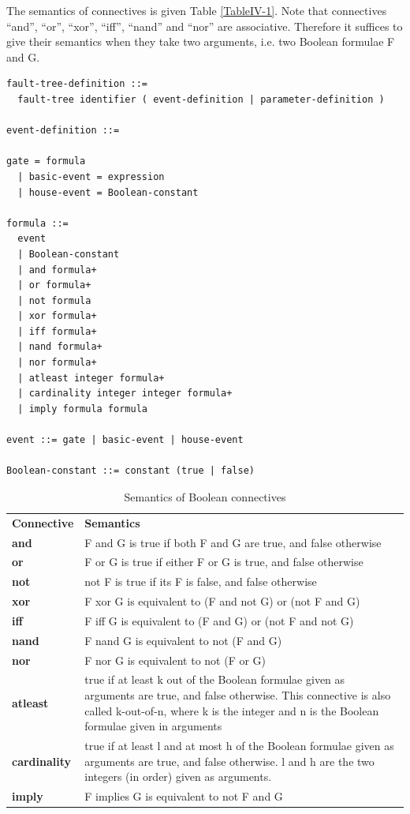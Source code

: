 \documentclass[11pt]{article}
\begin{document}
The semantics of connectives is given Table \ref{TableIV-1}. Note that connectives
``and'', ``or'', ``xor'', ``iff'', ``nand'' and ``nor'' are associative. Therefore
it suffices to give their semantics when they take two arguments, i.e.
two Boolean formulae F and G.


\lstset{language=XML,label= ,caption= ,captionpos=b,numbers=none}
\begin{lstlisting}
fault-tree-definition ::=
  fault-tree identifier ( event-definition | parameter-definition )

event-definition ::=

gate = formula
  | basic-event = expression
  | house-event = Boolean-constant

formula ::=
  event
  | Boolean-constant
  | and formula+
  | or formula+
  | not formula
  | xor formula+
  | iff formula+
  | nand formula+
  | nor formula+
  | atleast integer formula+
  | cardinality integer integer formula+
  | imply formula formula

event ::= gate | basic-event | house-event

Boolean-constant ::= constant (true | false)
\end{lstlisting}

\begin{table}[htbp]
\caption{\label{tab:org6263390}
Semantics of Boolean connectives}
\centering
\begin{tabular}{ll}
\textbf{Connective} & \textbf{Semantics}\\
\textbf{and} & F and G is true if both F and G are true, and false otherwise\\
\textbf{or} & F or G is true if either F or G is true, and false otherwise\\
\textbf{not} & not F is true if its F is false, and false otherwise\\
\textbf{xor} & F xor G is equivalent to (F and not G) or (not F and G)\\
\textbf{iff} & F iff G is equivalent to (F and G) or (not F and not G)\\
\textbf{nand} & F nand G is equivalent to not (F and G)\\
\textbf{nor} & F nor G is equivalent to not (F or G)\\
\textbf{atleast} & true if at least k out of the Boolean formulae given as arguments are true, and false otherwise. This connective is also called k-out-of-n, where k is the integer and n is the Boolean formulae given in arguments\\
\textbf{cardinality} & true if at least l and at most h of the Boolean formulae given as arguments are true, and false otherwise. l and h are the two integers (in order) given as arguments.\\
\textbf{imply} & F implies G is equivalent to not F and G\\
\end{tabular}
\end{table}
\end{document}
